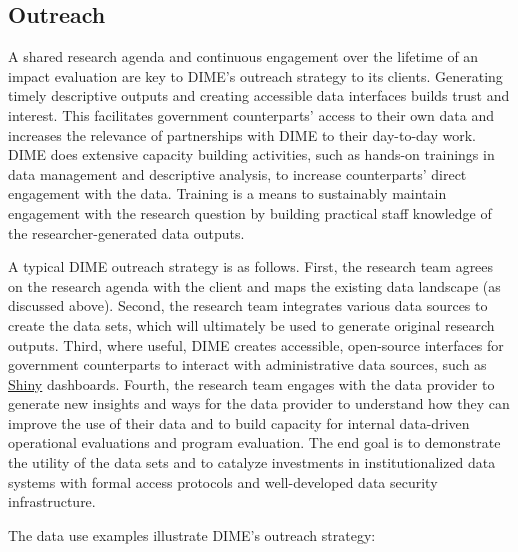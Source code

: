 \hypertarget{outreach-5}{%
\subsection{Outreach}\label{outreach-5}}

A shared research agenda and continuous engagement over the lifetime of an impact evaluation are key to DIME's outreach strategy to its clients. Generating timely descriptive outputs and creating accessible data interfaces builds trust and interest. This facilitates government counterparts' access to their own data and increases the relevance of partnerships with DIME to their day-to-day work. DIME does extensive capacity building activities, such as hands-on trainings in data management and descriptive analysis, to increase counterparts' direct engagement with the data. Training is a means to sustainably maintain engagement with the research question by building practical staff knowledge of the researcher-generated data outputs.

A typical DIME outreach strategy is as follows. First, the research team agrees on the research agenda with the client and maps the existing data landscape (as discussed above). Second, the research team integrates various data sources to create the data sets, which will ultimately be used to generate original research outputs. Third, where useful, DIME creates accessible, open-source interfaces for government counterparts to interact with administrative data sources, such as \href{https://shiny.rstudio.com/}{Shiny} dashboards. Fourth, the research team engages with the data provider to generate new insights and ways for the data provider to understand how they can improve the use of their data and to build capacity for internal data-driven operational evaluations and program evaluation. The end goal is to demonstrate the utility of the data sets and to catalyze investments in institutionalized data systems with formal access protocols and well-developed data security infrastructure.

The data use examples illustrate DIME's outreach strategy:

